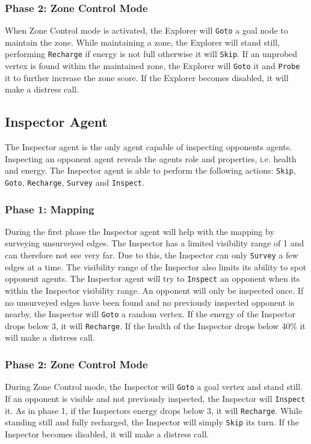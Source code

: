 \documentclass[11pt]{article}
\begin{document}
\subsubsection*{Phase 2: Zone Control Mode}
When Zone Control mode is activated, the Explorer will {\tt Goto} a goal node to maintain the zone. While maintaining a zone, the Explorer will stand still, performing {\tt Recharge} if energy is not full otherwise it will {\tt Skip}. If an unprobed vertex is found within the maintained zone, the Explorer will {\tt Goto} it and {\tt Probe} it to further increase the zone score. If the Explorer becomes disabled, it will make a distress call.

\subsection{Inspector Agent}
The Inspector agent is the only agent capable of inspecting opponents agents. Inspecting an opponent agent reveals the agents role and properties, i.e. health and energy. The Inspector agent is able to perform the following actions: {\tt Skip}, {\tt Goto}, {\tt Recharge}, {\tt Survey} and {\tt Inspect}.

\subsubsection*{Phase 1: Mapping}
During the first phase the Inspector agent will help with the mapping by surveying unsurveyed edges. The Inspector has a limited visibility range of 1 and can therefore not see very far. Due to this, the Inspector can only {\tt Survey} a few edges at a time. The visibility range of the Inspector also limits its ability to spot opponent agents. The Inspector agent will try to {\tt Inspect} an opponent when its within the Inspector visibility range. An opponent will only be inspected once. If no unsurveyed edges have been found and no previously inspected opponent is nearby, the Inspector will {\tt Goto} a random vertex. If the energy of the Inspector drops below 3, it will {\tt Recharge}. If the health of the Inspector drops below 40\% it will make a distress call.

\subsubsection*{Phase 2: Zone Control Mode}
During Zone Control mode, the Inspector will {\tt Goto} a goal vertex and stand still. If an opponent is visible and not previously inspected, the Inspector will {\tt Inspect} it. As in phase 1, if the Inspectors energy drops below 3, it will {\tt Recharge}. While standing still and fully recharged, the Inspector will simply {\tt Skip} its turn. If the Inspector becomes disabled, it will make a distress call.
\end{document}

